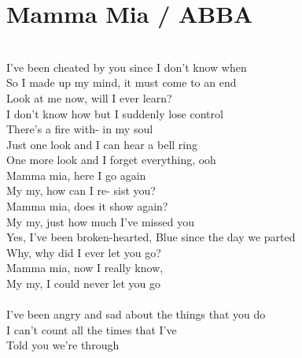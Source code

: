 \section{Mamma Mia / ABBA}\label{sec:mammamia}

\Aminor
\BflatMajor
\Cmajor
\Caugmented
\Dminor
\Eminor
\Fmajor
\Gmajor
\Gseven

   \\
 I've been  cheated by  you since I  don't know  when\\
 So I  made up my  mind, it must  come to an  end\\
 Look at me now,  will I ever learn?\\
 I don't know how  but I suddenly  lose control\\
There's a fire with-  in my soul\\
 Just  one  look and I can hear a bell ring\\
 One  more  look and I forget everything, ooh\\
 Mamma mia, here I go again\\
 My  my, how can I re-  sist you?\\
 Mamma mia, does it show again?\\
 My  my, just how much I've  missed you\\
Yes, I've been  broken-hearted,   Blue since the  day we parted\\
 Why,  why  did I ever  let you go?\\
 Mamma mia,  now I really know,\\
 My  my,  I could never  let you go\\
   \\
 I've been  angry and  sad about the  things that you  do\\
 I can't  count all the  times that I've\\
 Told you we're  through\\
